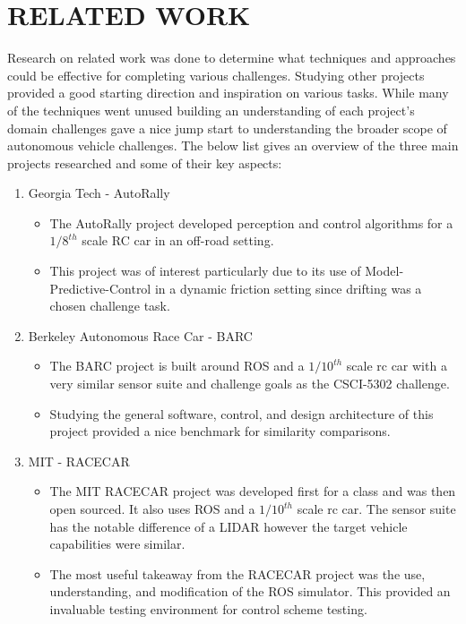 \documentclass[letterpaper, 10 pt, conference]{ieeeconf}  %
\begin{document}
\section{RELATED WORK}
Research on related work was done to determine what techniques and approaches could be effective for completing various challenges. Studying other projects provided a good starting direction and inspiration on various tasks. While many of the techniques went unused building an understanding of each project's domain challenges gave a nice jump start to understanding the broader scope of autonomous vehicle challenges. The below list gives an overview of the three main projects researched and some of their key aspects:
\begin{enumerate}
   \item Georgia Tech - AutoRally \cite{AutoRally}
   \begin{itemize}
        \item The AutoRally project developed perception and control algorithms for a $1/8^{th}$ scale RC car in an off-road setting.
        \item This project was of interest particularly due to its use of Model-Predictive-Control in a dynamic friction setting since drifting was a chosen challenge task. 
   \end{itemize}
   \item Berkeley Autonomous Race Car - BARC \cite{BARC}
     \begin{itemize}
        \item The BARC project is built around ROS and a $1/10^{th}$ scale rc car with a very similar sensor suite and challenge goals as the CSCI-5302 challenge.
        \item Studying the general software, control, and design architecture of this project provided a nice benchmark for similarity comparisons. 
   \end{itemize}
   \item MIT - RACECAR \cite{RACECAR}
   \begin{itemize}
        \item The MIT RACECAR project was developed first for a class and was then open sourced. It also uses ROS and a $1/10^{th}$ scale rc car. The sensor suite has the notable difference of a LIDAR however the target vehicle capabilities were similar. 
        \item The most useful takeaway from the RACECAR project was the use, understanding, and modification of the ROS simulator. This provided an invaluable testing environment for control scheme testing.  
    \end{itemize}
\end{enumerate}
\end{document}
